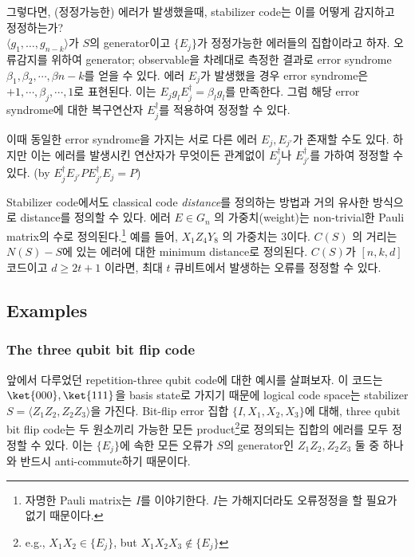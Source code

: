 그렇다면, (정정가능한) 에러가 발생했을때, stabilizer code는 이를 어떻게 감지하고 정정하는가?\\
$\langle g_1, \ldots, g_{n-k} \rangle$가 $S$의 generator이고 $\{E_j\}$가 정정가능한 에러들의 집합이라고 하자. 오류감지를 위하여 generator; observable을 차례대로 측정한 결과로 error syndrome $\beta_1, \beta_2, \cdots, \beta{n-k}$를 얻을 수 있다. 
에러 $E_j$가 발생했을 경우 error syndrome은 $+1, \cdots, \beta_j, \cdots, 1$로 표현된다. 이는 $E_j g_l E_j^\dagger = \beta_l g_l$를 만족한다.
그럼 해당 error syndrome에 대한 복구연산자 $E_j^\dagger$를 적용하여 정정할 수 있다. 

이때 동일한 error syndrome을 가지는 서로 다른 에러 $E_j, E_{j'}$가 존재할 수도 있다. 하지만 이는 에러를 발생시킨 연산자가 무엇이든 관계없이 $E_j^\dagger$나 $E_{j'}^{\dagger}$를 가하여 정정할 수 있다. (by $E_j^\dagger E_{j'} P E_{j'}^\dagger E_j = P $)

\vspace{0.2cm}
Stabilizer code에서도 classical code \textit{distance}를 정의하는 방법과 거의 유사한 방식으로 distance를 정의할 수 있다. 에러 $E \in G_n$ 의 가중치(weight)는 non-trivial한 Pauli matrix의 수로 정의된다.\footnote{자명한 Pauli matrix는 $I$를 이야기한다. $I$는 가해지더라도 오류정정을 할 필요가 없기 때문이다.} 예를 들어,  $X_1Z_4Y_8$ 의 가중치는 3이다.
$C(S)$ 의 거리는  $N(S) - S$에 있는 에러에 대한 minimum distance로 정의된다. $C(S)$가 $[n, k, d]$ 코드이고  $d \geq 2t + 1$ 이라면, 최대 $t$ 큐비트에서 발생하는 오류를 정정할 수 있다.

\subsection{Examples}
\subsubsection{The three qubit bit flip code}
앞에서 다루었던 repetition-three qubit code에 대한 예시를 살펴보자. 이 코드는 $\ket{000}, \ket{111}$을 basis state로 가지기 때문에 logical code space는 stabilizer $S = \langle Z_1Z_2, Z_2Z_3\rangle$을 가진다. 
Bit-flip error 집합 $\{I, X_1, X_2, X_3\}$에 대해, three qubit bit flip code는 두 원소끼리 가능한 모든 product\footnote{e.g., $X_1X_2 \in \{E_j\}$, but $X_1X_2X_3 \notin \{E_j\}$}로 정의되는 집합의 에러를 모두 정정할 수 있다. 이는 $\{E_j\}$에 속한 모든 오류가 $S$의 generator인 $Z_1Z_2, Z_2Z_3$ 둘 중 하나와 반드시 anti-commute하기 때문이다.

